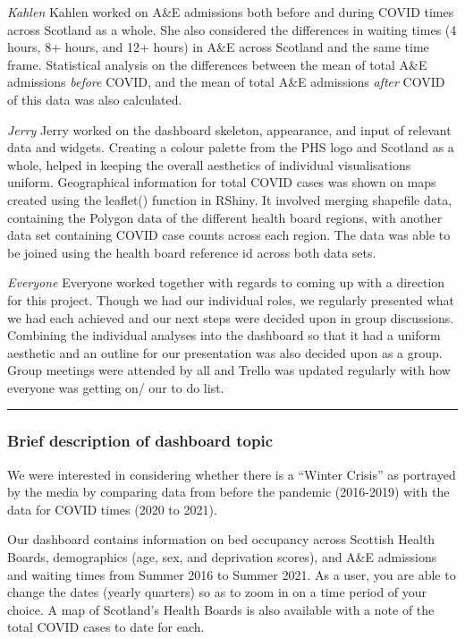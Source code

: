 \documentclass[
]{article}
\begin{document}
\emph{Kahlen} Kahlen worked on A\&E admissions both before and during
COVID times across Scotland as a whole. She also considered the
differences in waiting times (4 hours, 8+ hours, and 12+ hours) in A\&E
across Scotland and the same time frame. Statistical analysis on the
differences between the mean of total A\&E admissions \emph{before}
COVID, and the mean of total A\&E admissions \emph{after} COVID of this
data was also calculated.

\emph{Jerry} Jerry worked on the dashboard skeleton, appearance, and
input of relevant data and widgets. Creating a colour palette from the
PHS logo and Scotland as a whole, helped in keeping the overall
aesthetics of individual visualisations uniform. Geographical
information for total COVID cases was shown on maps created using the
leaflet() function in RShiny. It involved merging shapefile data,
containing the Polygon data of the different health board regions, with
another data set containing COVID case counts across each region. The
data was able to be joined using the health board reference id across
both data sets.

\emph{Everyone} Everyone worked together with regards to coming up with
a direction for this project. Though we had our individual roles, we
regularly presented what we had each achieved and our next steps were
decided upon in group discussions. Combining the individual analyses
into the dashboard so that it had a uniform aesthetic and an outline for
our presentation was also decided upon as a group. Group meetings were
attended by all and Trello was updated regularly with how everyone was
getting on/ our to do list.

\begin{center}\rule{0.5\linewidth}{0.5pt}\end{center}

\hypertarget{brief-description-of-dashboard-topic}{%
\subsubsection{Brief description of dashboard
topic}\label{brief-description-of-dashboard-topic}}

We were interested in considering whether there is a ``Winter Crisis''
as portrayed by the media by comparing data from before the pandemic
(2016-2019) with the data for COVID times (2020 to 2021).

Our dashboard contains information on bed occupancy across Scottish
Health Boards, demographics (age, sex, and deprivation scores), and A\&E
admissions and waiting times from Summer 2016 to Summer 2021. As a user,
you are able to change the dates (yearly quarters) so as to zoom in on a
time period of your choice. A map of Scotland's Health Boards is also
available with a note of the total COVID cases to date for each.
\end{document}
